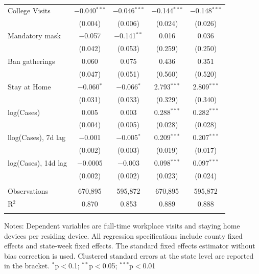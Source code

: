 \documentclass[9pt,twocolumn,twoside,lineno]{pnas-new}
\begin{document}
\begin{table}[!htbp]
{\begin{tabular}{@{\extracolsep{1pt}}lcc|cc}
  College Visits & $-$0.040$^{***}$ & $-$0.046$^{***}$ & $-$0.144$^{***}$ & $-$0.148$^{***}$ \\
  & (0.004) & (0.006) & (0.024) & (0.026) \\
 Mandatory mask & $-$0.057 & $-$0.141$^{**}$ & 0.016 & 0.036 \\
  & (0.042) & (0.053) & (0.259) & (0.250) \\
  Ban gatherings & 0.060 & 0.075 & 0.436 & 0.351 \\
  & (0.047) & (0.051) & (0.560) & (0.520) \\
  Stay at Home & $-$0.060$^{*}$ & $-$0.066$^{*}$ & 2.793$^{***}$ & 2.809$^{***}$ \\
  & (0.031) & (0.033) & (0.329) & (0.340) \\ \hline
  log(Cases) & 0.005 & 0.003 & 0.288$^{***}$ & 0.282$^{***}$ \\
  & (0.004) & (0.005) & (0.028) & (0.028) \\
  llog(Cases), 7d lag & $-$0.001 & $-$0.005$^{*}$ & 0.209$^{***}$ & 0.207$^{***}$ \\
  & (0.002) & (0.003) & (0.019) & (0.017) \\
log(Cases), 14d lag & $-$0.0005 & $-$0.003 & 0.098$^{***}$ & 0.097$^{***}$ \\
  & (0.002) & (0.002) & (0.023) & (0.024) \\ 
   \hline \\[-1.8ex]
Observations & 670,895 & 595,872 & 670,895 & 595,872 \\
R$^{2}$ & 0.870 & 0.853 & 0.889 & 0.888 \\
\hline
\hline \\[-1.8ex]  
\end{tabular}
}
{\scriptsize \begin{flushleft}
Notes:  Dependent variables are full-time workplace visits and staying home devices per residing device. All regression specifications include county fixed effects and state-week fixed effects. The standard fixed effects estimator without bias correction is used. Clustered standard errors at the state level are reported in the bracket.  {$^{*}$p$<$0.1; $^{**}$p$<$0.05; $^{***}$p$<$0.01}
\end{flushleft}}
\end{table}
\end{document}
